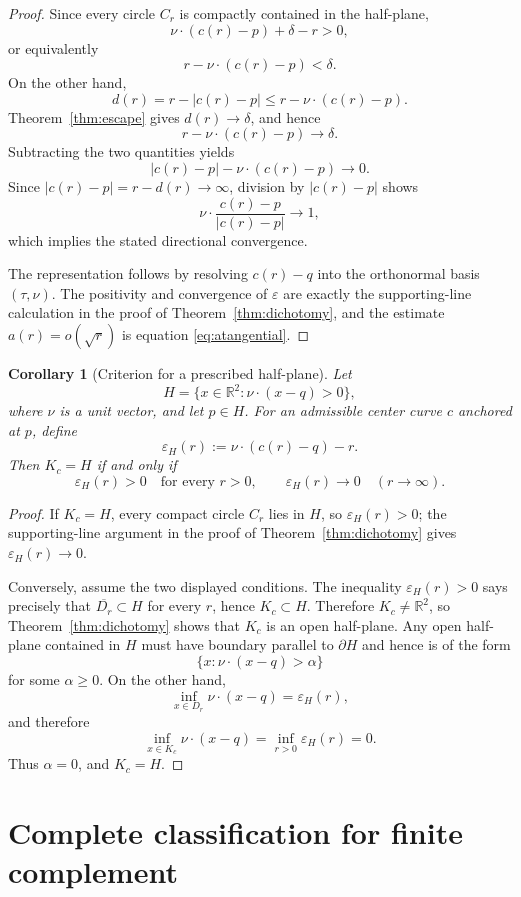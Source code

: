 \documentclass[11pt]{article}
\newtheorem{corollary}[theorem]{Corollary}
\newcommand{\R}{\mathbb{R}}
\newcommand{\ol}{\overline}
\begin{document}
\begin{proof}
Since every circle $C_r$ is compactly contained in the half-plane,
\[
\nu\cdot(c(r)-p)+\delta-r>0,
\]
or equivalently
\[
r-\nu\cdot(c(r)-p)<\delta.
\]
On the other hand,
\[
d(r)=r-|c(r)-p|
\le r-\nu\cdot(c(r)-p).
\]
Theorem~\ref{thm:escape} gives $d(r)\to\delta$, and hence
\[
r-\nu\cdot(c(r)-p)\to\delta.
\]
Subtracting the two quantities yields
\[
|c(r)-p|-\nu\cdot(c(r)-p)\to0.
\]
Since $|c(r)-p|=r-d(r)\to\infty$, division by $|c(r)-p|$ shows
\[
\nu\cdot\frac{c(r)-p}{|c(r)-p|}\to1,
\]
which implies the stated directional convergence.

The representation follows by resolving $c(r)-q$ into the orthonormal basis $(\tau,\nu)$. The positivity and convergence of $\varepsilon$ are exactly the supporting-line calculation in the proof of Theorem~\ref{thm:dichotomy}, and the estimate $a(r)=o(\sqrt r)$ is equation \eqref{eq:atangential}.
\end{proof}

\begin{corollary}[Criterion for a prescribed half-plane]\label{cor:prescribedhalfplane}
Let
\[
H=\{x\in\R^2:\nu\cdot(x-q)>0\},
\]
where $\nu$ is a unit vector, and let $p\in H$. For an admissible center curve $c$ anchored at $p$, define
\[
\varepsilon_H(r):=\nu\cdot(c(r)-q)-r.
\]
Then $K_c=H$ if and only if
\[
\varepsilon_H(r)>0\quad\text{for every }r>0,
\qquad
\varepsilon_H(r)\longrightarrow0\quad(r\to\infty).
\]
\end{corollary}

\begin{proof}
If $K_c=H$, every compact circle $C_r$ lies in $H$, so $\varepsilon_H(r)>0$; the supporting-line argument in the proof of Theorem~\ref{thm:dichotomy} gives $\varepsilon_H(r)\to0$.

Conversely, assume the two displayed conditions. The inequality $\varepsilon_H(r)>0$ says precisely that $\ol{D_r}\subset H$ for every $r$, hence $K_c\subset H$. Therefore $K_c\ne\R^2$, so Theorem~\ref{thm:dichotomy} shows that $K_c$ is an open half-plane. Any open half-plane contained in $H$ must have boundary parallel to $\partial H$ and hence is of the form
\[
\{x:\nu\cdot(x-q)>\alpha\}
\]
for some $\alpha\ge0$. On the other hand,
\[
\inf_{x\in D_r}\nu\cdot(x-q)=\varepsilon_H(r),
\]
and therefore
\[
\inf_{x\in K_c}\nu\cdot(x-q)
=\inf_{r>0}\varepsilon_H(r)=0.
\]
Thus $\alpha=0$, and $K_c=H$.
\end{proof}

\section{Complete classification for finite complement}
\end{document}
